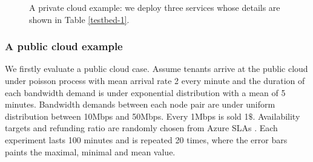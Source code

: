 \documentclass[sigconf]{acmart}
\begin{document}
\begin{figure}[t]
\centering
{}

\caption{A private cloud example: we deploy three services whose details are shown in Table \ref{testbed-1}.}
\label{e1}
\end{figure}






\subsubsection{A public cloud example}
We firstly evaluate a public cloud case.
Assume tenants arrive at the public cloud under poisson process with mean arrival rate 2 every minute and the duration of each bandwidth demand is under exponential distribution with a mean of 5 minutes.
Bandwidth demands between each node pair are under uniform distribution between 10Mbps and 50Mbps.
Every 1Mbps is sold 1$\$$.
Availability targets and refunding ratio are randomly chosen from Azure SLAs \cite{azure}.
Each experiment lasts 100 minutes and is repeated 20 times, where the error bars paints the maximal, minimal and mean value.
\end{document}

